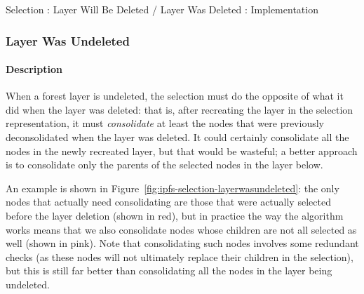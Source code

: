 \begin{stulisting}[p]
\caption{Selection : Layer Will Be Deleted / Layer Was Deleted : Implementation}
\label{code:ipfs-selection-layerwillbedeleted}

\end{stulisting}


\afterpage{\clearpage}
\newpage

\subsubsection{Layer Was Undeleted}


\paragraph{Description}

When a forest layer is undeleted, the selection must do the opposite of what it did when the layer was deleted: that is, after recreating the layer in the selection representation, it must \emph{consolidate} at least the nodes that were previously deconsolidated when the layer was deleted. It could certainly consolidate all the nodes in the newly recreated layer, but that would be wasteful; a better approach is to consolidate only the parents of the selected nodes in the layer below.

An example is shown in Figure~\ref{fig:ipfs-selection-layerwasundeleted}: the only nodes that actually need consolidating are those that were actually selected before the layer deletion (shown in red), but in practice the way the algorithm works means that we also consolidate nodes whose children are not all selected as well (shown in pink). Note that consolidating such nodes involves some redundant checks (as these nodes will not ultimately replace their children in the selection), but this is still far better than consolidating all the nodes in the layer being undeleted.

